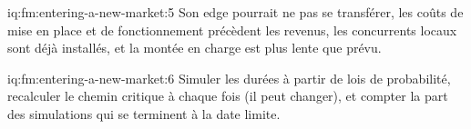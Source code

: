 \begin{solution}{iq:fm:entering-a-new-market:5}
Son edge pourrait ne pas se transférer, les coûts de mise en place et de fonctionnement précèdent les revenus, les concurrents locaux sont déjà installés, et la montée en charge est plus lente que prévu.
\end{solution}

\begin{solution}{iq:fm:entering-a-new-market:6}
Simuler les durées à partir de lois de probabilité, recalculer le chemin critique à chaque fois (il peut changer), et compter la part des simulations qui se terminent à la date limite.
\end{solution}
